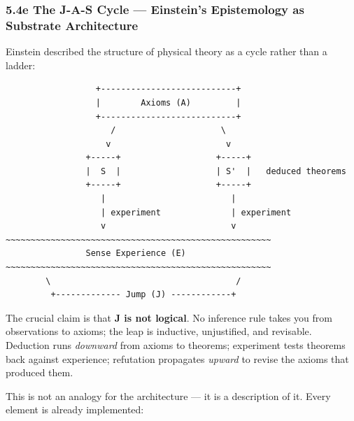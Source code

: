 \documentclass[
  11pt,
  a4paper,
]{article}
\begin{document}
\subsubsection{5.4e The J-A-S Cycle --- Einstein's Epistemology as
Substrate
Architecture}\label{e-the-j-a-s-cycle-einsteins-epistemology-as-substrate-architecture}

Einstein described the structure of physical theory as a cycle rather
than a ladder:

\begin{verbatim}
                  +---------------------------+
                  |        Axioms (A)         |
                  +---------------------------+
                     /                     \
                    v                       v
                +-----+                   +-----+
                |  S  |                   | S'  |   deduced theorems
                +-----+                   +-----+
                   |                         |
                   | experiment              | experiment
                   v                         v
~~~~~~~~~~~~~~~~~~~~~~~~~~~~~~~~~~~~~~~~~~~~~~~~~~~~~
                Sense Experience (E)
~~~~~~~~~~~~~~~~~~~~~~~~~~~~~~~~~~~~~~~~~~~~~~~~~~~~~
        \                                     /
         +------------- Jump (J) ------------+
\end{verbatim}

The crucial claim is that \textbf{J is not logical}. No inference rule
takes you from observations to axioms; the leap is inductive,
unjustified, and revisable. Deduction runs \emph{downward} from axioms
to theorems; experiment tests theorems back against experience;
refutation propagates \emph{upward} to revise the axioms that produced
them.

This is not an analogy for the architecture --- it is a description of
it. Every element is already implemented:
\end{document}
